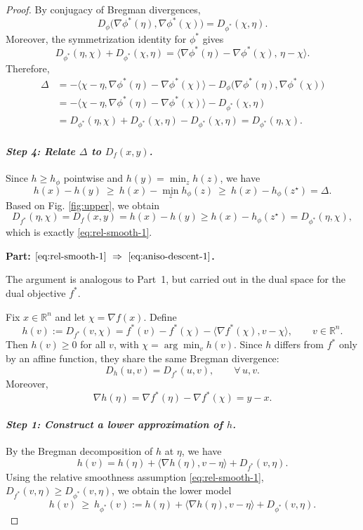 \documentclass{article}
\theoremstyle{plain}
\theoremstyle{definition}
\theoremstyle{remark}
\begin{document}
\begin{proof}
By conjugacy of Bregman divergences,
\[
D_\phi\bigl(\nabla\phi^*(\eta),\nabla\phi^*(\chi)\bigr)
=
D_{\phi^*}(\chi,\eta).
\]
Moreover, the symmetrization identity for $\phi^*$ gives
\[
D_{\phi^*}(\eta,\chi)+D_{\phi^*}(\chi,\eta)
=
\langle \nabla\phi^*(\eta)-\nabla\phi^*(\chi),\,\eta-\chi\rangle.
\]
Therefore,
\begin{align*}
\Delta
&=
-\langle \chi-\eta,\nabla\phi^*(\eta)-\nabla\phi^*(\chi)\rangle
- D_\phi\bigl(\nabla\phi^*(\eta),\nabla\phi^*(\chi)\bigr)\\
&=
-\langle \chi-\eta,\nabla\phi^*(\eta)-\nabla\phi^*(\chi)\rangle
- D_{\phi^*}(\chi,\eta)\\
&=
D_{\phi^*}(\eta,\chi)+D_{\phi^*}(\chi,\eta)-D_{\phi^*}(\chi,\eta)
= D_{\phi^*}(\eta,\chi).
\end{align*}

\medskip
\paragraph{\em Step 4: Relate $\Delta$ to $D_f(x,y)$.}
Since $h\ge h_\phi$ pointwise and $h(y)=\min_z h(z)$, we have
\[
h(x)-h(y)\ \ge\ h(x)-\min_z h_\phi(z)\ \ge\ h(x)-h_\phi(z^\star)=\Delta.
\]
Based on Fig. \ref{fig:upper}, we obtain
\[
D_{f^*}(\eta,\chi) = D_f(x,y)
= h(x)-h(y)
\ge h(x)-h_\phi(z^\star)
= D_{\phi^*}(\eta,\chi),
\]
which is exactly \eqref{eq:rel-smooth-1}.

\medskip
{\bf Part: $\eqref{eq:rel-smooth-1}\ \Rightarrow\ \eqref{eq:aniso-descent-1}$.}

The argument is analogous to Part~1, but carried out in the dual space for the dual objective $f^*$.

Fix $x\in\mathbb{R}^n$ and let $\chi=\nabla f(x)$. Define
\[
h(v):=D_{f^*}(v,\chi)
= f^*(v)-f^*(\chi)-\langle \nabla f^*(\chi),v-\chi\rangle,
\qquad v\in\mathbb{R}^n.
\]
Then $h(v)\ge 0$ for all $v$, with $\chi=\arg\min_v h(v)$. Since $h$ differs from $f^*$ only by an affine function, they share the same Bregman divergence:
\[
D_h(u,v)=D_{f^*}(u,v), \qquad \forall\,u,v.
\]
Moreover,
\[
\nabla h(\eta)=\nabla f^*(\eta)-\nabla f^*(\chi)=y-x.
\]

\paragraph{\em Step 1: Construct a lower approximation of $h$.}
By the Bregman decomposition of $h$ at $\eta$, we have
\[
h(v)
= h(\eta)+\langle \nabla h(\eta),v-\eta\rangle + D_{f^*}(v,\eta).
\]
Using the relative smoothness assumption \eqref{eq:rel-smooth-1},
$D_{f^*}(v,\eta)\ge D_{\phi^*}(v,\eta)$, we obtain the lower model
\begin{equation}\label{eq:key-lower-bound}
h(v)\ \ge\ h_{\phi^*}(v)
:= h(\eta)+\langle \nabla h(\eta),v-\eta\rangle + D_{\phi^*}(v,\eta).
\end{equation}


\end{proof}
\end{document}
